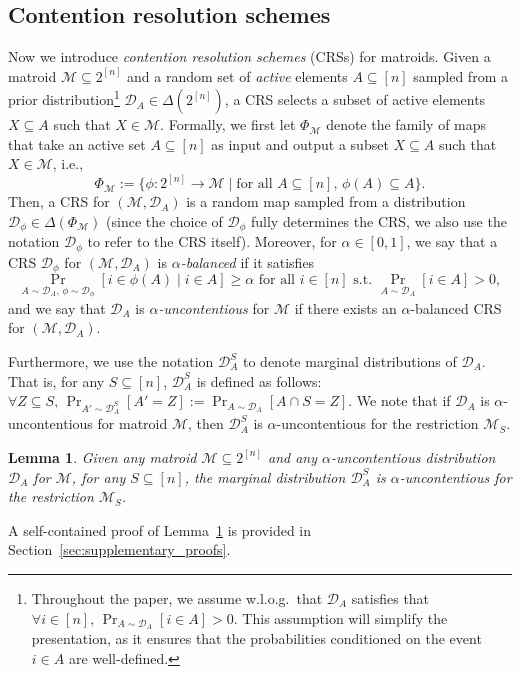 \documentclass[11pt]{article}
\newcommand{\D}{\mathcal D}
\newcommand{\M}{{\mathcal M}}
\newtheorem{lemma}[theorem]{Lemma}
\begin{document}
\subsection{Contention resolution schemes}\label{sec:crs_preliminary}
Now we introduce \emph{contention resolution schemes} (CRSs) for matroids. Given a matroid $\M\subseteq 2^{[n]}$ and a random set of \emph{active} elements $A\subseteq [n]$ sampled from a prior distribution\footnote{Throughout the paper, we assume w.l.o.g.~that $\D_A$ satisfies that $\forall i\in[n],\,{\Pr}_{A\sim \D_A}[i\in A]>0$. This assumption will simplify the presentation, as it ensures that the probabilities conditioned on the event $i\in A$ are well-defined.} $\D_A\in\Delta(2^{[n]})$, a CRS selects a subset of active elements $X\subseteq A$ such that $X\in\M$. Formally, we first let $\Phi_{\M}$ denote the family of maps that take an active set $A\subseteq [n]$ as input and output a subset $X\subseteq A$ such that $X\in\M$, i.e.,
\[
\Phi_{\M}:=\{\phi:2^{[n]}\to\M \mid \textrm{for all $A\subseteq [n]$, $\phi(A)\subseteq A$}\}.
\]
Then, a CRS for $(\M,\D_A)$ is a random map sampled from a distribution $\D_{\phi}\in\Delta(\Phi_{\M})$ (since the choice of $\D_{\phi}$ fully determines the CRS, we also use the notation $\D_{\phi}$ to refer to the CRS itself). Moreover, for $\alpha\in[0,1]$, we say that a CRS $\D_{\phi}$ for $(\M,\D_A)$ is {\em $\alpha$-balanced} if it satisfies
\[
    {\Pr}_{A\sim \D_A,\,\phi\sim \D_{\phi}}[i\in \phi(A)\mid i\in A]\ge \alpha \textrm{ for all $i\in[n]$ s.t. }{\Pr}_{A\sim \D_A}[i\in A]>0,
\]
and we say that $\D_A$ is {\em $\alpha$-uncontentious} for $\M$ if there exists an $\alpha$-balanced CRS for $(\M,\D_A)$.

Furthermore, we use the notation $\D_A^{S}$ to denote marginal distributions of $\D_A$. That is, for any $S\subseteq [n]$, $\D_A^{S}$ is defined as follows: $\forall Z\subseteq S,\,\Pr_{A'\sim\D_A^{S}}[A'=Z]:=\Pr_{A\sim\D_A}[A\cap S=Z]$. We note that if $\D_A$ is $\alpha$-uncontentious for matroid $\M$, then $\D_A^{S}$ is $\alpha$-uncontentious for the restriction $\M_S$.
\begin{lemma}\label{lem:uncontentious_marginal}
Given any matroid $\M\subseteq 2^{[n]}$ and any $\alpha$-uncontentious distribution $\D_A$ for $\M$, for any $S\subseteq [n]$, the marginal distribution $\D_A^{S}$ is $\alpha$-uncontentious for the restriction $\M_S$.
\end{lemma}
A self-contained proof of Lemma~\ref{lem:uncontentious_marginal} is provided in Section~\ref{sec:supplementary_proofs}.
\end{document}
